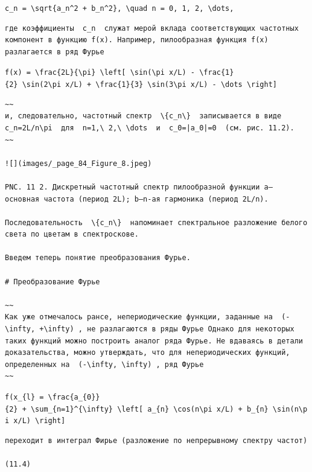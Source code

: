\documentclass[
  ukrainian,
]{article}
\begin{document}
\texttt{c\_n\ =\ \textbackslash{}sqrt\{a\_n\^{}2\ +\ b\_n\^{}2\},\ \textbackslash{}quad\ n\ =\ 0,\ 1,\ 2,\ \textbackslash{}dots,}

\begin{verbatim}
где коэффициенты  c_n  служат мерой вклада соответствующих частотных компонент в функцию f(x). Например, пилообразная функция f(x) разлагается в ряд Фурье
\end{verbatim}

\texttt{f(x)\ =\ \textbackslash{}frac\{2L\}\{\textbackslash{}pi\}\ \textbackslash{}left{[}\ \textbackslash{}sin(\textbackslash{}pi\ x/L)\ -\ \textbackslash{}frac\{1\}\{2\}\ \textbackslash{}sin(2\textbackslash{}pi\ x/L)\ +\ \textbackslash{}frac\{1\}\{3\}\ \textbackslash{}sin(3\textbackslash{}pi\ x/L)\ -\ \textbackslash{}dots\ \textbackslash{}right{]}}

\begin{verbatim}
~~
и, следовательно, частотный спектр  \{c_n\}  записывается в виде  c_n=2L/n\pi  для  n=1,\ 2,\ \dots  и  c_0=|a_0|=0  (см. рис. 11.2).
~~

![](images/_page_84_Figure_8.jpeg)

PNC. 11 2. Дискретный частотный спектр пилообразной функции a— основная частота (период 2L); b—n-ая гармоника (период 2L/n).

Последовательность  \{c_n\}  напоминает спектральное разложение белого света по цветам в спектроскове.

Введем теперь понятие преобразования Фурье.

# Преобразование Фурье

~~
Как уже отмечалось рансе, непериодические функции, заданные на  (-\infty, +\infty) , не разлагаются в ряды Фурье Однако для некоторых таких функций можно построить аналог ряда Фурье. Не вдаваясь в детали доказательства, можно утверждать, что для непериодических функций, определенных на  (-\infty, \infty) , ряд Фурье
~~
\end{verbatim}

\texttt{f(x\_\{l\}\ =\ \textbackslash{}frac\{a\_\{0\}\}\{2\}\ +\ \textbackslash{}sum\_\{n=1\}\^{}\{\textbackslash{}infty\}\ \textbackslash{}left{[}\ a\_\{n\}\ \textbackslash{}cos(n\textbackslash{}pi\ x/L)\ +\ b\_\{n\}\ \textbackslash{}sin(n\textbackslash{}pi\ x/L)\ \textbackslash{}right{]}}

\begin{verbatim}
переходит в интеграл Фирье (разложение по непрерывному спектру частот)

(11.4)
\end{verbatim}
\end{document}

